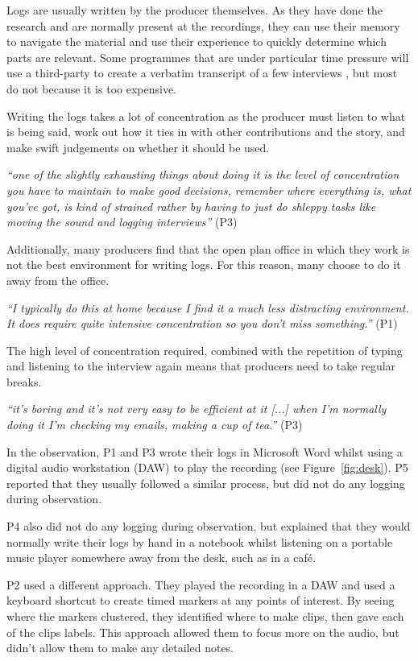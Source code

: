 Logs are usually written by the producer themselves. As they have done the research and are normally present at the
recordings, they can use their memory to navigate the material and use their experience to quickly determine which
parts are relevant. Some programmes that are under particular time pressure will use a third-party to create a verbatim
transcript of a few interviews \citep{Baume2015}, but most do not because it is too expensive.

Writing the logs takes a lot of concentration as the producer must listen to what is being said, work out how it ties
in with other contributions and the story, and make swift judgements on whether it should be used.

\textit{``one of the slightly exhausting things about doing it is the level of concentration you have to maintain to
  make good decisions, remember where everything is, what you've got, is kind of strained rather by having to just do
  shleppy tasks like moving the sound and logging interviews''} (P3)

Additionally, many producers find that the open plan office in which they work is not the best environment for writing
logs. For this reason, many choose to do it away from the office. 

\textit{``I typically do this at home because I find it a much less distracting environment. It does require quite
  intensive concentration so you don't miss something.''} (P1)

The high level of concentration required, combined with the repetition of typing and listening to the interview again
means that producers need to take regular breaks.

\textit{``it's boring and it's not very easy to be efficient at it [...] when I'm normally doing it I'm checking my
  emails, making a cup of tea.''} (P3)

In the observation, P1 and P3 wrote their logs in Microsoft Word whilst using a digital audio workstation (DAW) to play
the recording (see Figure~\ref{fig:desk}). P5 reported that they usually followed a similar process, but did not do any
logging during observation.

P4 also did not do any logging during observation, but explained that they would normally write their logs by hand in a
notebook whilst listening on a portable music player somewhere away from the desk, such as in a caf\'e.

P2 used a different approach. They played the recording in a DAW and used a keyboard shortcut to create timed markers
at any points of interest. By seeing where the markers clustered, they identified where to make clips, then gave each
of the clips labels. This approach allowed them to focus more on the audio, but didn't allow them to make any detailed
notes.

